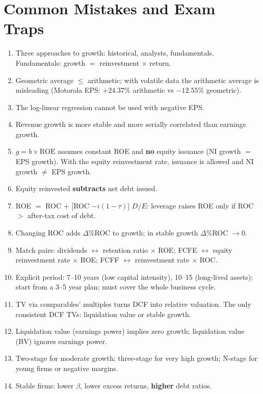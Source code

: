 \section{Common Mistakes and Exam Traps}
\begin{trapbox}
\begin{enumerate}[leftmargin=*]
  \item Three approaches to growth: historical, analysts, fundamentals. Fundamentals: growth $=$ reinvestment $\times$ return.
  \item Geometric average $\leq$ arithmetic; with volatile data the arithmetic average is misleading (Motorola EPS: $+24.37\%$ arithmetic vs $-12.55\%$ geometric).
  \item The log-linear regression cannot be used with negative EPS.
  \item Revenue growth is more stable and more serially correlated than earnings growth.
  \item $g=b\times\text{ROE}$ assumes constant ROE and \textbf{no} equity issuance (NI growth $=$ EPS growth). With the equity reinvestment rate, issuance is allowed and NI growth $\neq$ EPS growth.
  \item Equity reinvested \textbf{subtracts} net debt issued.
  \item ROE $=$ ROC $+$ [ROC $-i(1-\tau)$] $D/E$: leverage raises ROE only if ROC $>$ after-tax cost of debt.
  \item Changing ROC adds $\Delta\%$ROC to growth; in stable growth $\Delta\%$ROC $\to0$.
  \item Match pairs: dividends $\leftrightarrow$ retention ratio $\times$ ROE; FCFE $\leftrightarrow$ equity reinvestment rate $\times$ ROE; FCFF $\leftrightarrow$ reinvestment rate $\times$ ROC.
  \item Explicit period: 7--10 years (low capital intensity), 10--15 (long-lived assets); start from a 3--5 year plan; must cover the whole business cycle.
  \item TV via comparables' multiples turns DCF into relative valuation. The only consistent DCF TVs: liquidation value or stable growth.
  \item Liquidation value (earnings power) implies zero growth; liquidation value (BV) ignores earnings power.
  \item Two-stage for moderate growth; three-stage for very high growth; N-stage for young firms or negative margins.
  \item Stable firms: lower $\beta$, lower excess returns, \textbf{higher} debt ratios.

\end{enumerate}
\end{trapbox}
